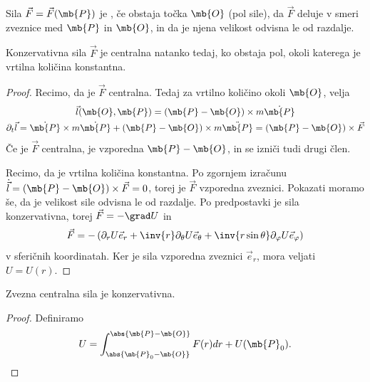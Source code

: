
\begin{definicija}
  Sila $\vec{F} = \vec{F}(\mb{P})$ je , če obstaja točka
  $\mb{O}$ (pol sile), da $\vec{F}$ deluje v smeri zveznice med $\mb{P}$ in
  $\mb{O}$, in da je njena velikost odvisna le od razdalje.
\end{definicija}

\begin{trditev}
  Konzervativna sila $\vec{F}$ je centralna natanko tedaj, ko obstaja pol, okoli
  katerega je vrtilna količina konstantna.
\end{trditev}

\begin{proof}
  Recimo, da je $\vec{F}$ centralna.
  Tedaj za vrtilno količino okoli $\mb{O}$, velja
  \begin{gather*}
	\vec{l}(\mb{O}, \mb{P}) = (\mb{P}-\mb{O}) \times m \dot{\mb{P}} \\
	\partial_t \vec{l} = \dot{\mb{P}} \times m \dot{\mb{P}}
	+ (\mb{P} - \mb{O}) \times m \ddot{\mb{P}}
	= (\mb{P} - \mb{O}) \times \vec{F}
  \end{gather*}
  Če je $\vec{F}$ centralna, je vzporedna $\mb{P} - \mb{O}$, in se izniči tudi
  drugi člen.

  Recimo, da je vrtilna količina konstantna.
  Po zgornjem izračunu $\dot{\vec{l}} = (\mb{P} - \mb{O}) \times \vec{F} = 0$,
  torej je $\vec{F}$ vzporedna zveznici.
  Pokazati moramo še, da je velikost sile odvisna le od razdalje.
  Po predpostavki je sila konzervativna, torej $\vec{F} = -\grad U$ in
  \[
	\vec{F} = - \left(
	  \partial_r U \vec{e}_r + \inv{r} \partial_\theta U \vec{e}_\theta + \inv{r
		\sin \theta} \partial_\varphi U \vec{e}_\varphi
	\right)
  \]
  v sferičnih koordinatah.
  Ker je sila vzporedna zveznici $\vec{e}_r$, mora veljati $U = U(r)$.
\end{proof}


\begin{trditev}
  Zvezna centralna sila je konzervativna.
\end{trditev}

\begin{proof}
  Definiramo
  \[
	U = \int_{\abs{\mb{P}_0 - \mb{O}}}^{\abs{\mb{P}- \mb{O}}} F(r) dr +
	U(\mb{P}_0).
  \]
\end{proof}

